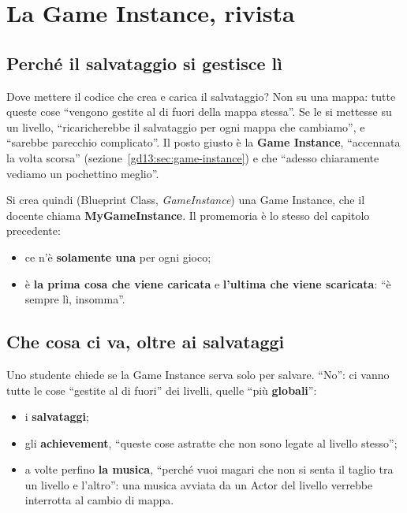 \section{La Game Instance, rivista}
\label{gd16:sec:game-instance}

\subsection{Perché il salvataggio si gestisce lì}

Dove mettere il codice che crea e carica il salvataggio? Non su una mappa:
tutte queste cose ``vengono gestite al di fuori della mappa stessa''. Se le si
mettesse su un livello, ``ricaricherebbe il salvataggio per ogni mappa che
cambiamo'', e ``sarebbe parecchio complicato''. Il posto giusto è la
\textbf{Game Instance}, ``accennata la volta scorsa''
(sezione~\ref{gd13:sec:game-instance}) e che ``adesso chiaramente vediamo un
pochettino meglio''.

Si crea quindi (Blueprint Class, \emph{GameInstance}) una Game Instance, che il
docente chiama \textbf{MyGameInstance}. Il promemoria è lo stesso del capitolo
precedente:
\begin{itemize}
  \item ce n'è \textbf{solamente una} per ogni gioco;
  \item è \textbf{la prima cosa che viene caricata} e \textbf{l'ultima che viene
        scaricata}: ``è sempre lì, insomma''.
\end{itemize}

\subsection{Che cosa ci va, oltre ai salvataggi}

Uno studente chiede se la Game Instance serva solo per salvare. ``No'': ci
vanno tutte le cose ``gestite al di fuori'' dei livelli, quelle ``più
\textbf{globali}'':
\begin{itemize}
  \item i \textbf{salvataggi};
  \item gli \textbf{achievement}, ``queste cose astratte che non sono legate al
        livello stesso'';
  \item a volte perfino \textbf{la musica}, ``perché vuoi magari che non si senta
        il taglio tra un livello e l'altro'': una musica avviata da un Actor del
        livello verrebbe interrotta al cambio di mappa.
\end{itemize}


